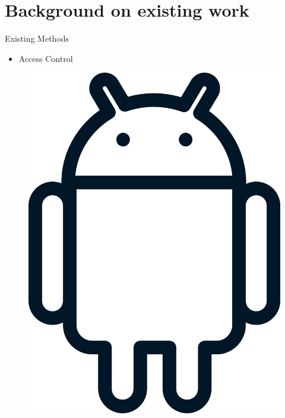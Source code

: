 \documentclass[aspectratio=169]{beamer}
[aspectratio=169] %
\begin{document}
\section{Background on existing work}

\begin{frame}{Existing Methods}
  \begin{minipage}{0.49\textwidth} 
    \begin{itemize}
      \item Access Control
    \end{itemize}
  \end{minipage}
  \hfill
  \begin{minipage}{0.49\textwidth} 
    \begin{figure}
      \centering
      \includegraphics[height=0.5\textheight]{figures/android.png}
    \end{figure}
  \end{minipage}
\end{frame}
\end{document}
